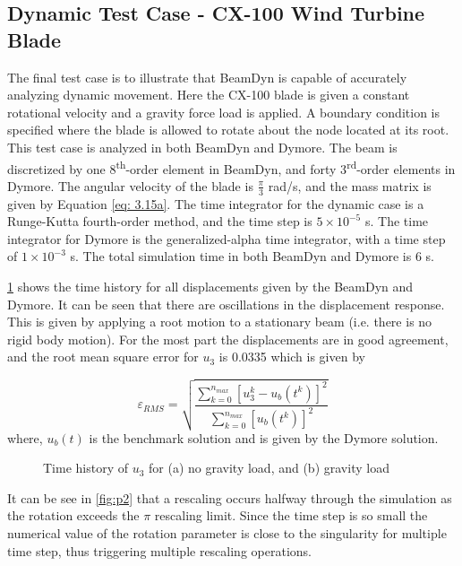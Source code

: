 \documentclass[letterpaper,12pt]{article}
\begin{document}
\newpage

\subsection{Dynamic Test Case - CX-100 Wind Turbine Blade}
The final test case is to illustrate that BeamDyn is capable of accurately analyzing dynamic movement. Here the CX-100 blade is given a constant rotational velocity and a gravity force load is applied. A boundary condition is specified where the blade is allowed to rotate about the node located at its root. This test case is analyzed in both BeamDyn and Dymore. The beam is discretized by one 8\textsuperscript{th}-order element in BeamDyn, and forty 3\textsuperscript{rd}-order elements in Dymore. The angular velocity of the blade is $\frac{\pi}{3}$ rad/s, and the mass matrix is given by Equation \ref{eq: 3.15a}. The time integrator for the dynamic case is a Runge-Kutta fourth-order method, and the time step is $5 \times 10^{-5}$ s. The time integrator for Dymore is the generalized-alpha time integrator, with a time step of $1 \times 10^{-3}$ s. The total simulation time in both BeamDyn and Dymore is 6 s.

\ref{fig:dym} shows the time history for all displacements given by the BeamDyn and Dymore. It can be seen that there are oscillations in the displacement response. This is given by applying a root motion to a stationary beam (i.e. there is no rigid body motion). For the most part the displacements are in good agreement, and the root mean square error for $u_3$ is 0.0335 which is given by

\begin{equation}
\varepsilon_{RMS}=\sqrt{\frac{\sum_{k=0}^{n_{max}}[u_3^k-u_b(t^k)]^2}{\sum_{k=0}^{n_{max}}[u_b(t^k)]^2}}
\end{equation} 
where, $u_b(t)$ is the benchmark solution and is given by the Dymore solution.

\begin{figure}
	\begin{center}
					
					
		\caption{\label{fig:dym}Time history of $u_3$ for (a) no gravity load, and (b) gravity load }
	\end{center}
\end{figure}
It can be see in \ref{fig:p2} that a rescaling occurs halfway through the simulation as the rotation exceeds the $\pi$ rescaling limit. Since the time step is so small the numerical value of the rotation parameter is close to the singularity for multiple time step, thus triggering multiple rescaling operations.
\end{document}
